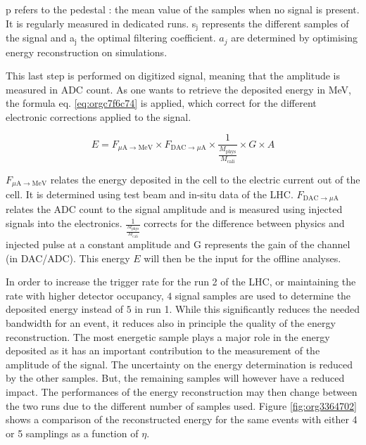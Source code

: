 p refers to the pedestal : the mean value of the samples when no signal is present.
It is regularly measured in dedicated runs.
s\(_{\text{j}}\) represents the different samples of the signal and a\(_{\text{j}}\) the optimal filtering coefficient.
$a_j$ are determined by optimising energy reconstruction on simulations.

This last step is performed on digitized signal, meaning that the amplitude is measured in ADC count.
As one wants to retrieve the deposited energy in MeV, the formula eq. \ref{eq:orgc7f6c74} is applied, which correct for the different electronic corrections applied to the signal.

\begin{equation}
\label{eq:orgc7f6c74}
  E = F_{\mu \mbox{A}\rightarrow \mbox{MeV}}
  \times
  F_{\mbox{DAC}\rightarrow\mu\mbox{A}}
  \times
  \frac{1}{\frac{M_{\mbox{phys}}}{M_{\mbox{cali}}}}
  \times G \times A
\end{equation}

\(F_{\mu \mbox{A}\rightarrow \mbox{MeV}}\) relates the energy deposited in the cell to the electric current out of the cell.
It is determined using test beam and in-situ data of the LHC.
\(F_{\mbox{DAC}\rightarrow\mu\mbox{A}}\) relates the ADC count to the signal amplitude and is measured using injected signals into the electronics.
\(\frac{1}{\frac{M_{\mbox{phys}}}{M_{\mbox{cali}}}}\) corrects for the difference between physics and injected pulse at a constant amplitude and G represents the gain of the channel (in DAC/ADC).
This energy \(E\) will then be the input for the offline analyses.

In order to increase the trigger rate for the run 2 of the LHC, or maintaining the rate with higher detector occupancy, \(4\) signal samples are used to determine the deposited energy instead of \(5\) in run 1.
While this significantly reduces the needed bandwidth for an event, it reduces also in principle the quality of the energy reconstruction.
The most energetic sample plays a major role in the energy deposited as it has an important contribution to the measurement of the amplitude of the signal.
The uncertainty on the energy determination is reduced by the other samples.
But, the remaining samples will however have a reduced impact.
The performances of the energy reconstruction may then change between the two runs due to the different number of samples used.
Figure \ref{fig:org3364702} shows a comparison of the reconstructed energy for the same events with either 4 or 5 samplings as a function of $\eta$.


